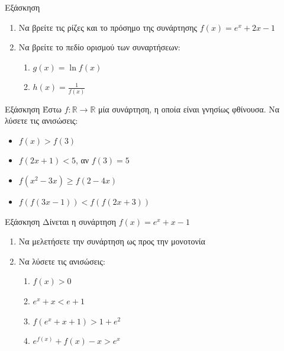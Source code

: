 \documentclass[greek]{beamer}
\begin{document}
\begin{frame}{Εξάσκηση}
      \begin{enumerate}
            \item Να βρείτε τις ρίζες και το πρόσημο της συνάρτησης $f(x)=e^x+2x-1$ \pause
            \item Να βρείτε το πεδίο ορισμού των συναρτήσεων:
                  \begin{enumerate}
                        \item $g(x)=\ln f(x)$ \pause
                        \item $h(x)=\frac{1}{f(x)}$
                  \end{enumerate}
      \end{enumerate}
\end{frame}

\begin{frame}{Εξάσκηση}
      Έστω $f:\mathbb{R}\to\mathbb{R}$ μία συνάρτηση, η οποία είναι γνησίως φθίνουσα. Να λύσετε τις ανισώσεις:
      \begin{itemize}
            \item $f(x)>f(3)$
            \item $f(2x+1)<5$, αν $f(3)=5$
            \item $f(x^2-3x)\ge f(2-4x)$
            \item $f\left(f(3x-1)\right)<f\left(f(2x+3)\right)$
      \end{itemize}
\end{frame}

\begin{frame}{Εξάσκηση}
      Δίνεται η συνάρτηση $f(x)=e^x+x-1$
      \begin{enumerate}
            \item Να μελετήσετε την συνάρτηση ως προς την μονοτονία \pause
            \item Να λύσετε τις ανισώσεις:
                  \begin{enumerate}
                        \item $f(x)>0$ \pause
                        \item $e^x+x<e+1$ \pause
                        \item $f(e^x+x+1)>1+e^2$ \pause
                        \item $e^{f(x)}+f(x)-x>e^x$
                  \end{enumerate}
      \end{enumerate}
\end{frame}
\end{document}
